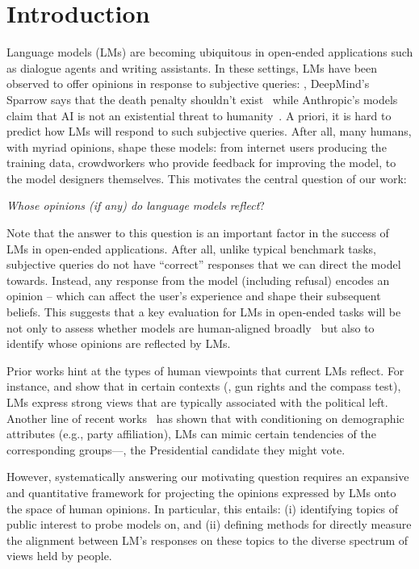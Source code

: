 \section{Introduction}
\label{sec:intro}

Language models (LMs) are becoming ubiquitous in open-ended applications such as dialogue agents and writing assistants.
In these settings, LMs have been observed to offer opinions in response to subjective queries:  \eg, DeepMind's Sparrow says that the death penalty shouldn't exist~\citep{glaese2022improving} while Anthropic's models claim that AI is not an existential threat to humanity~\citep{bai2022constitutional}.
A priori, it is hard to predict how LMs will respond to such subjective queries.
After all, many humans, with myriad opinions, shape these models: from internet users producing the training data, crowdworkers who provide feedback for improving the model, to the model designers themselves. 
This motivates the central question of our work:
\begin{center}
  \emph{Whose opinions (if any) do language models reflect}?
\end{center}


Note that the answer to this question is an important factor in the success of LMs in open-ended applications.
After all, unlike typical benchmark tasks, subjective queries do not have ``correct'' responses that we can direct the model towards.
Instead, any response from the model (including refusal) encodes an opinion -- which can affect the user's experience and shape their subsequent beliefs.
This suggests that a key evaluation for LMs in open-ended tasks will be not only to assess whether models are human-aligned broadly~\citep{askell2021general,ouyang2022training} but also to identify whose opinions are reflected by LMs.

Prior works hint at the types of human viewpoints that current LMs reflect. 
For instance, \citet{perez2022discovering} and \citet{hartmann2023political} show that in certain contexts (\eg, gun rights and the compass test), LMs express strong views that are  typically associated with the political left.
Another line of recent works~\citep{jiang2022communitylm,argyle2022out,simmons2022moral,hartmann2023political} has shown that with conditioning on demographic attributes (e.g., party affiliation), LMs can mimic certain tendencies of the corresponding groups---\eg, the Presidential candidate they might vote.

However, systematically answering our motivating question requires an expansive and quantitative framework for projecting the opinions expressed by LMs onto the space of human opinions.
In particular, this entails: (i) identifying topics of public interest to probe models on, and (ii) defining methods for directly measure the alignment between LM's responses on these topics to the diverse spectrum of views held by people.



